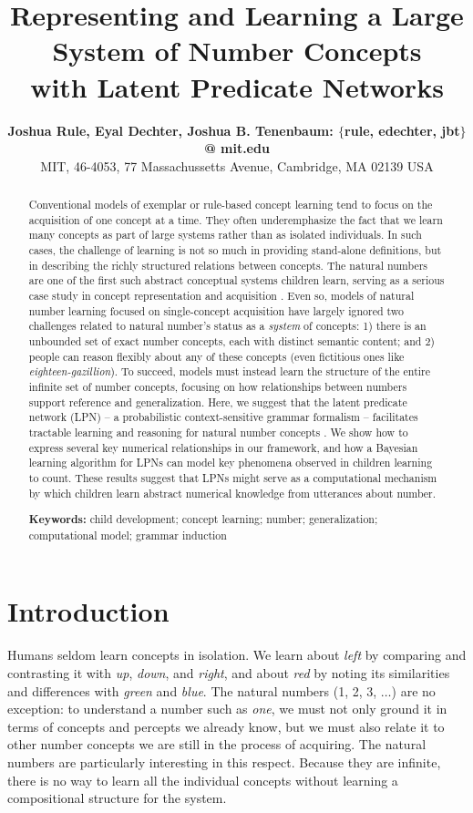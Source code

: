 \documentclass[10pt,letterpaper]{article}
\title{Representing and Learning a Large System of Number Concepts\\with Latent Predicate Networks}
\author{
  {\large \bf Joshua Rule, Eyal Dechter, Joshua B. Tenenbaum: $\{$rule, edechter, jbt$\}$ @ mit.edu}\\
  MIT, 46-4053, 77 Massachussetts Avenue, Cambridge, MA 02139 USA}
\begin{document}
\maketitle

\begin{abstract}
  Conventional models of exemplar or rule-based concept learning tend
  to focus on the acquisition of one concept at a time. They often
  underemphasize the fact that we learn many concepts as part of large
  systems rather than as isolated individuals. In such cases, the
  challenge of learning is not so much in providing stand-alone
  definitions, but in describing the richly structured relations
  between concepts. The natural numbers are one of the first such
  abstract conceptual systems children learn, serving as a serious
  case study in concept representation and acquisition
  \citep{fuson1988children,galGel2005,Car2009}. Even so, models of
  natural number learning focused on single-concept acquisition have
  largely ignored two challenges related to natural number's status as
  a \emph{system} of concepts: 1) there is an unbounded set of exact
  number concepts, each with distinct semantic content; and 2) people
  can reason flexibly about any of these concepts (even fictitious
  ones like \emph{eighteen-gazillion}). To succeed, models must
  instead learn the structure of the entire infinite set of number
  concepts, focusing on how relationships between numbers support
  reference and generalization. Here, we suggest that the latent
  predicate network (LPN) -- a probabilistic context-sensitive grammar
  formalism -- facilitates tractable learning and reasoning for
  natural number concepts \citep{DecRulTen2015}. We show how to
  express several key numerical relationships in our framework, and
  how a Bayesian learning algorithm for LPNs can model key phenomena
  observed in children learning to count. These results suggest that
  LPNs might serve as a computational mechanism by which children
  learn abstract numerical knowledge from utterances about number.

  \textbf{Keywords:}
  child development; concept learning; number; generalization;
  computational model; grammar induction
\end{abstract}

\section{Introduction}

Humans seldom learn concepts in isolation. We learn about \emph{left}
by comparing and contrasting it with \emph{up}, \emph{down}, and
\emph{right}, and about \emph{red} by noting its similarities and
differences with \emph{green} and \emph{blue}. The natural numbers (1,
2, 3, $\ldots$) are no exception: to understand a number such as
\emph{one}, we must not only ground it in terms of concepts and
percepts we already know, but we must also relate it to other number
concepts we are still in the process of acquiring. The natural numbers
are particularly interesting in this respect. Because they are
infinite, there is no way to learn all the individual concepts without
learning a compositional structure for the system.
\end{document}
